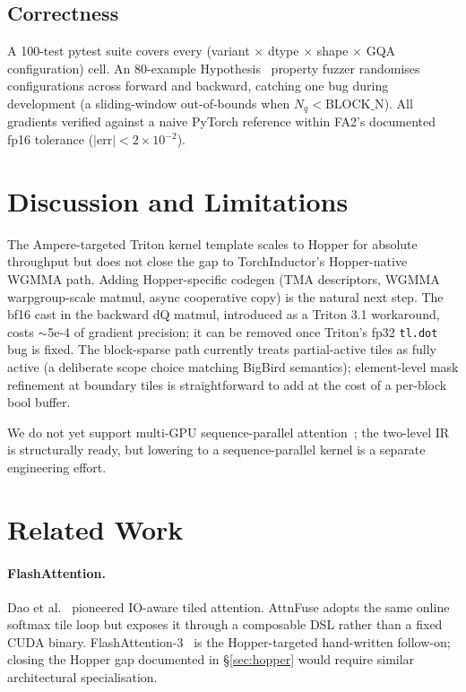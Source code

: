 \documentclass[10pt,twocolumn]{article}
\begin{document}
\subsection{Correctness}

A 100-test pytest suite covers every (variant $\times$ dtype $\times$
shape $\times$ GQA configuration) cell. An 80-example
Hypothesis~\cite{maciver2019hypothesis} property fuzzer randomises
configurations across forward and backward, catching one bug during
development (a sliding-window out-of-bounds when $N_q < \text{BLOCK\_N}$).
All gradients verified against a naive PyTorch reference within FA2's
documented fp16 tolerance ($|\mathrm{err}| < 2 \times 10^{-2}$).

\section{Discussion and Limitations}

The Ampere-targeted Triton kernel template scales to Hopper for
absolute throughput but does not close the gap to TorchInductor's
Hopper-native WGMMA path. Adding Hopper-specific codegen (TMA
descriptors, WGMMA warpgroup-scale matmul, async cooperative copy) is
the natural next step. The bf16 cast in the backward dQ matmul,
introduced as a Triton 3.1 workaround, costs $\sim$5e-4 of gradient
precision; it can be removed once Triton's fp32 \texttt{tl.dot} bug is
fixed. The block-sparse path currently treats partial-active tiles as
fully active (a deliberate scope choice matching BigBird semantics);
element-level mask refinement at boundary tiles is straightforward to
add at the cost of a per-block bool buffer.

We do not yet support multi-GPU sequence-parallel
attention~\cite{liu2023ring}; the two-level IR is structurally ready,
but lowering to a sequence-parallel kernel is a separate engineering
effort.

\section{Related Work}

\paragraph{FlashAttention.}
Dao et al.~\cite{dao2022flashattention,dao2023flashattention2}
pioneered IO-aware tiled attention. AttnFuse adopts the same online
softmax tile loop but exposes it through a composable DSL rather than
a fixed CUDA binary. FlashAttention-3~\cite{shah2024flashattention3} is
the Hopper-targeted hand-written follow-on; closing the Hopper gap
documented in \S\ref{sec:hopper} would require similar architectural
specialisation.
\end{document}
